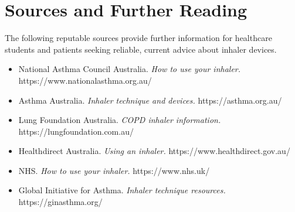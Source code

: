 \section*{Sources and Further Reading}
The following reputable sources provide further information for healthcare students and patients seeking reliable, current advice about inhaler devices.
\begin{itemize}
    \item National Asthma Council Australia. \textit{How to use your inhaler.} https://www.nationalasthma.org.au/
    \item Asthma Australia. \textit{Inhaler technique and devices.} https://asthma.org.au/
    \item Lung Foundation Australia. \textit{COPD inhaler information.} https://lungfoundation.com.au/
    \item Healthdirect Australia. \textit{Using an inhaler.} https://www.healthdirect.gov.au/
    \item NHS. \textit{How to use your inhaler.} https://www.nhs.uk/
    \item Global Initiative for Asthma. \textit{Inhaler technique resources.} https://ginasthma.org/
\end{itemize}
